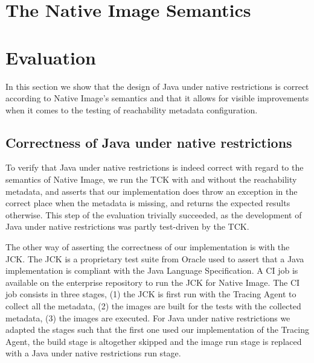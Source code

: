 \chapter{The Native Image Semantics}\label{native_image_specs}



\chapter{Evaluation}
In this section we show that the design of Java under native restrictions is correct according to Native Image's semantics and that it allows for visible improvements when it comes to the testing of reachability metadata configuration.

\section{Correctness of Java under native restrictions}

To verify that Java under native restrictions is indeed correct with regard to the semantics of Native Image, we run the TCK with and without the reachability metadata, and asserts that our implementation does throw an exception in the correct place when the metadata is missing, and returns the expected results otherwise. This step of the evaluation trivially succeeded, as the development of Java under native restrictions was partly test-driven by the TCK.

The other way of asserting the correctness of our implementation is with the JCK. The JCK is a proprietary test suite from Oracle used to assert that a Java implementation is compliant with the Java Language Specification. A CI job is available on the enterprise repository to run the JCK for Native Image. The CI job consists in three stages, (1) the JCK is first run with the Tracing Agent to collect all the metadata, (2) the images are built for the tests with the collected metadata, (3) the images are executed. For Java under native restrictions we adapted the stages such that the first one used our implementation of the Tracing Agent, the build stage is altogether skipped and the image run stage is replaced with a Java under native restrictions run stage.

